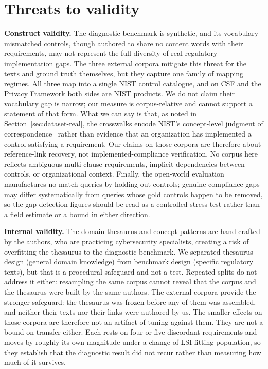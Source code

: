 \documentclass[smallextended,natbib]{svjour3}
\begin{document}
\section{Threats to validity}
\label{sec:threats}

\noindent\textbf{Construct validity.}
The diagnostic benchmark is synthetic, and its vocabulary-mismatched controls, though authored to share no content words with their requirements, may not represent the full diversity of real regulatory--implementation gaps.
The three external corpora mitigate this threat for the texts and ground truth themselves, but they capture one family of mapping regimes. All three map into a single NIST control catalogue, and on CSF and the Privacy Framework both sides are NIST products. We do not claim their vocabulary gap is narrow; our measure is corpus-relative and cannot support a statement of that form. What we can say is that, as noted in Section~\ref{sec:dataset-real}, the crosswalks encode NIST's concept-level judgment of correspondence~\citep{NISTIR8477} rather than evidence that an organization has implemented a control satisfying a requirement.
Our claims on those corpora are therefore about reference-link recovery, not implemented-compliance verification.
No corpus here reflects ambiguous multi-clause requirements, implicit dependencies between controls, or organizational context.
Finally, the open-world evaluation manufactures no-match queries by holding out controls; genuine compliance gaps may differ systematically from queries whose gold controls happen to be removed, so the gap-detection figures should be read as a controlled stress test rather than a field estimate or a bound in either direction.

\noindent\textbf{Internal validity.}
The domain thesaurus and concept patterns are hand-crafted by the authors, who are practicing cybersecurity specialists, creating a risk of overfitting the thesaurus to the diagnostic benchmark.
We separated thesaurus design (general domain knowledge) from benchmark design (specific regulatory texts), but that is a procedural safeguard and not a test. Repeated splits do not address it either: resampling the same corpus cannot reveal that the corpus and the thesaurus were built by the same authors.
The external corpora provide the stronger safeguard: the thesaurus was frozen before any of them was assembled, and neither their texts nor their links were authored by us.
The smaller effects on those corpora are therefore not an artifact of tuning against them. They are not a bound on transfer either. Each rests on four or five discordant requirements and moves by roughly its own magnitude under a change of LSI fitting population, so they establish that the diagnostic result did not recur rather than measuring how much of it survives.
\end{document}
